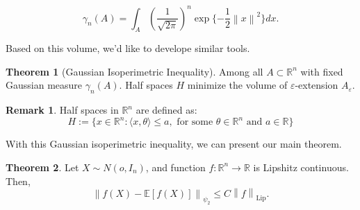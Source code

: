 \documentclass[9pt,onesided]{article}
\newcommand{\ip}[2]{\langle #1,#2 \rangle}
\newcommand{\nm}[1]{\left\lVert#1\right\rVert}
\newcommand{\re}{\mathbb{R}}
\newcommand{\ex}[1]{\mathbb{E}[#1]}
\newcommand{\mc}{\color{BlueViolet}}
\renewcommand{\le}{\leqslant}
\theoremstyle{definition}
\newtheorem{theorem}{\mc Theorem}
\newtheorem*{remark}{\mc Remark}
\begin{document}
\begin{equation*}
    \gamma_n(A)=\int_A (\frac{1}{ \sqrt{2\pi}})^n \exp\{-\frac{1}{2}\nm{x}^2\}dx.
\end{equation*}

Based on this volume, we'd like to develope similar tools.

 \begin{theorem}
[Gaussian Isoperimetric Inequality] Among all $A\subset \re^n$ with fixed Gaussian measure $\gamma_n(A)$. Half spaces $H$ minimize the volume of $\varepsilon$-extension $A_\varepsilon$. 
 \end{theorem}

\begin{remark}
    Half spaces in $\re^n$ are defined as:
    \begin{equation*}
        H:=\{ x\in \re^n: \ip{x}{ \theta}\le a ,\text{ for some } \theta \in \re^n \text{ and } a\in \re \}
    \end{equation*}
\end{remark}

With this Gaussian isoperimetric inequality, we can present our main theorem.

\begin{theorem}
    Let $X\sim N(o,I_n)$, and function $f: \re^n\to \re$ is Lipshitz continuous. Then, 
    \begin{equation*}
         \nm{ f(X)-\ex{f(X)}}_{\psi_2}\le C \nm{ f}_{\mathrm{Lip}}.
    \end{equation*}
\end{theorem}
\end{document}
